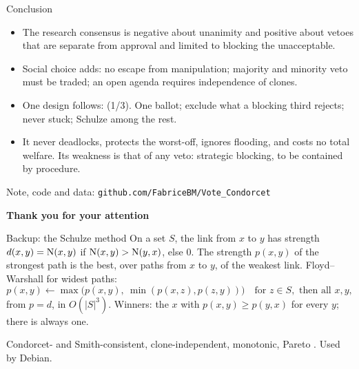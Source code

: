\documentclass[10pt,aspectratio=169]{beamer}
\begin{document}
\begin{frame}{Conclusion}
  \begin{itemize}
    \item The research consensus is \alert{negative about unanimity} and positive about vetoes that are
      separate from approval and limited to blocking the unacceptable.
    \item Social choice adds: no escape from manipulation; majority and minority veto must be traded; an
      open agenda requires independence of clones.
    \item One design follows: \alert{\QVC(1/3)}. One ballot; exclude what a blocking third rejects; never
      stuck; Schulze among the rest.
    \item It never deadlocks, protects the worst-off, ignores flooding, and costs no total welfare. Its
      weakness is that of any veto: strategic blocking, to be contained by procedure.
  \end{itemize}
  \vfill
  \begin{center}
    \small Note, code and data: \texttt{github.com/FabriceBM/Vote\_Condorcet}
  \end{center}
\end{frame}

\begin{frame}
  \centering\Large
  \textbf{Thank you for your attention}
\end{frame}

\appendix

\begin{frame}{Backup: the Schulze method}
  On a set $S$, the link from $x$ to $y$ has strength $d(x,y) = \operatorname{N}(x,y)$ if $\operatorname{N}(x,y) > \operatorname{N}(y,x)$, else
  $0$. The strength $p(x,y)$ of the strongest path is the best, over paths from $x$ to $y$, of the weakest
  link. Floyd--Warshall for widest paths:
  \[
    p(x,y) \gets \max\bigl(p(x,y),\ \min(p(x,z), p(z,y))\bigr) \quad \text{for } z \in S, \text{ then all } x, y,
  \]
  from $p = d$, in $O(|S|^3)$. Winners: the $x$ with $p(x,y) \ge p(y,x)$ for every $y$; there is always one.
  \medskip

  Condorcet- and Smith-consistent, clone-independent, monotonic, Pareto . Used by
  Debian.
\end{frame}
\end{document}
